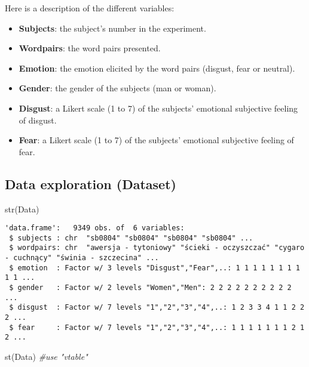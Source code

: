 \documentclass[
]{article}
\newenvironment{Shaded}{\begin{snugshade}}{\end{snugshade}}
\newcommand{\CommentTok}[1]{\textcolor[rgb]{0.56,0.35,0.01}{\textit{#1}}}
\newcommand{\FunctionTok}[1]{\textcolor[rgb]{0.00,0.00,0.00}{#1}}
\newcommand{\NormalTok}[1]{#1}
\begin{document}
Here is a description of the different variables:

\begin{itemize}
\item
  \textbf{Subjects}: the subject's number in the experiment.
\item
  \textbf{Wordpairs}: the word pairs presented.
\item
  \textbf{Emotion}: the emotion elicited by the word pairs (disgust,
  fear or neutral).
\item
  \textbf{Gender}: the gender of the subjects (man or woman).
\item
  \textbf{Disgust}: a Likert scale (1 to 7) of the subjects' emotional
  subjective feeling of disgust.
\item
  \textbf{Fear}: a Likert scale (1 to 7) of the subjects' emotional
  subjective feeling of fear.
\end{itemize}

\hypertarget{data-exploration-dataset}{%
\subsection{Data exploration (Dataset)}\label{data-exploration-dataset}}

\begin{Shaded}
\begin{Highlighting}[]
\FunctionTok{str}\NormalTok{(Data)}
\end{Highlighting}
\end{Shaded}

\begin{verbatim}
'data.frame':   9349 obs. of  6 variables:
 $ subjects : chr  "sb0804" "sb0804" "sb0804" "sb0804" ...
 $ wordpairs: chr  "awersja - tytoniowy" "ścieki - oczyszczać" "cygaro - cuchnący" "świnia - szczecina" ...
 $ emotion  : Factor w/ 3 levels "Disgust","Fear",..: 1 1 1 1 1 1 1 1 1 1 ...
 $ gender   : Factor w/ 2 levels "Women","Men": 2 2 2 2 2 2 2 2 2 2 ...
 $ disgust  : Factor w/ 7 levels "1","2","3","4",..: 1 2 3 3 4 1 1 2 2 2 ...
 $ fear     : Factor w/ 7 levels "1","2","3","4",..: 1 1 1 1 1 1 1 2 1 2 ...
\end{verbatim}

\begin{Shaded}
\begin{Highlighting}[]
\FunctionTok{st}\NormalTok{(Data) }\CommentTok{\#use "vtable"}
\end{Highlighting}
\end{Shaded}
\end{document}
